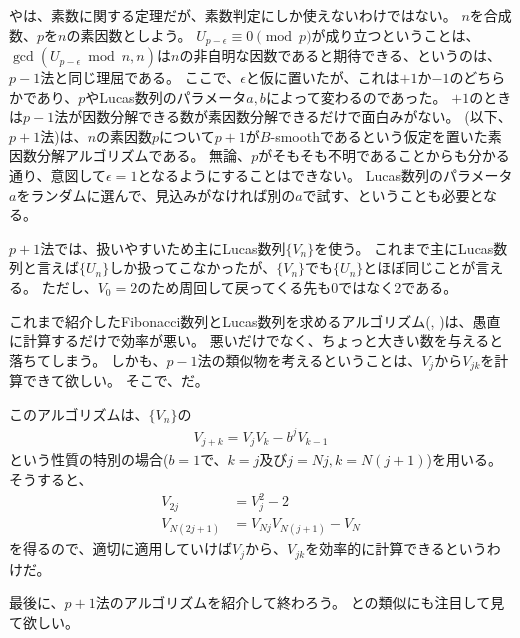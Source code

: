 やは、素数に関する定理だが、素数判定にしか使えないわけではない。
$n$を合成数、$p$を$n$の素因数としよう。
$U_{p-\epsilon} \equiv 0 \pmod{p}$が成り立つということは、$\gcd(U_{p-\epsilon} \bmod{n}, n)$は$n$の非自明な因数であると期待できる、というのは、$p-1$法と同じ理屈である。
ここで、$\epsilon$と仮に置いたが、これは$+1$か$-1$のどちらかであり、$p$やLucas数列のパラメータ$a,b$によって変わるのであった。
$+1$のときは$p-1$法が因数分解できる数が素因数分解できるだけで面白みがない。
(以下、$p+1$法)は、$n$の素因数$p$について$p+1$が$B$-smoothであるという仮定を置いた素因数分解アルゴリズムである\cite{Williams1982}。
無論、$p$がそもそも不明であることからも分かる通り、意図して$\epsilon=1$となるようにすることはできない。
Lucas数列のパラメータ$a$をランダムに選んで、見込みがなければ別の$a$で試す、ということも必要となる。

$p+1$法では、扱いやすいため主にLucas数列$\{V_n\}$を使う。
これまで主にLucas数列と言えば$\{U_n\}$しか扱ってこなかったが、$\{V_n\}$でも$\{U_n\}$とほぼ同じことが言える。
ただし、$V_0=2$のため周回して戻ってくる先も0ではなく2である。

これまで紹介したFibonacci数列とLucas数列を求めるアルゴリズム(, )は、愚直に計算するだけで効率が悪い。
悪いだけでなく、ちょっと大きい数を与えると落ちてしまう。
しかも、$p-1$法の類似物を考えるということは、$V_j$から$V_{jk}$を計算できて欲しい。
そこで、だ。


このアルゴリズムは、$\{V_n\}$の
\begin{align*}
V_{j+k} = V_jV_k - b^jV_{k-1}
\end{align*}
という性質の特別の場合($b=1$で、$k=j$及び$j=Nj,k=N(j+1)$)を用いる。
そうすると、
\begin{align*}
V_{2j} &= V_j^2 - 2\\
V_{N(2j+1)} &= V_{Nj}V_{N(j+1)} - V_N
\end{align*}
を得るので、適切に適用していけば$V_j$から、$V_{jk}$を効率的に計算できるというわけだ。

最後に、$p+1$法のアルゴリズムを紹介して終わろう。
との類似にも注目して見て欲しい。

